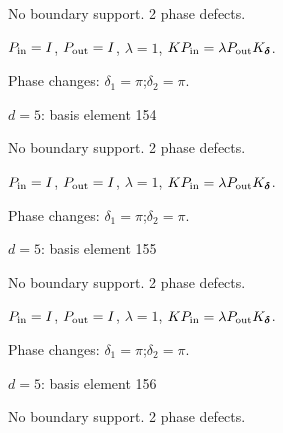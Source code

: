 No boundary support. 2 phase defects.
\begin{center}
\end{center}
\vspace{-1mm}
$P_{\rm in}=I$, \quad $P_{\rm out}=I$, \quad $\lambda=1$, \qquad $K P_{\rm in}=\lambda P_{\rm out}K_{\boldsymbol\delta}$.
\par\smallskip\begin{minipage}{.98\linewidth}\small Phase changes: $\delta_{1}=\pi$;\quad $\delta_{2}=\pi$.\end{minipage}
\vfill
{\footnotesize\texttt{}}
\newpage
{}
{\Large $d=5$: basis element 154}\par
No boundary support. 2 phase defects.
\begin{center}
\end{center}
\vspace{-1mm}
$P_{\rm in}=I$, \quad $P_{\rm out}=I$, \quad $\lambda=1$, \qquad $K P_{\rm in}=\lambda P_{\rm out}K_{\boldsymbol\delta}$.
\par\smallskip\begin{minipage}{.98\linewidth}\small Phase changes: $\delta_{1}=\pi$;\quad $\delta_{2}=\pi$.\end{minipage}
\vfill
{\footnotesize\texttt{}}
\newpage
{}
{\Large $d=5$: basis element 155}\par
No boundary support. 2 phase defects.
\begin{center}
\end{center}
\vspace{-1mm}
$P_{\rm in}=I$, \quad $P_{\rm out}=I$, \quad $\lambda=1$, \qquad $K P_{\rm in}=\lambda P_{\rm out}K_{\boldsymbol\delta}$.
\par\smallskip\begin{minipage}{.98\linewidth}\small Phase changes: $\delta_{1}=\pi$;\quad $\delta_{2}=\pi$.\end{minipage}
\vfill
{\footnotesize\texttt{}}
\newpage
{}
{\Large $d=5$: basis element 156}\par
No boundary support. 2 phase defects.
\begin{center}
\end{center}
